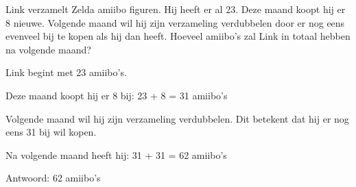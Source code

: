 \begin{opgave}
Link verzamelt Zelda amiibo figuren. Hij heeft er al 23. Deze maand koopt hij 
er 8 nieuwe. Volgende maand wil hij zijn verzameling verdubbelen door er nog 
eens evenveel bij te kopen als hij dan heeft. Hoeveel amiibo's zal Link in 
totaal hebben na volgende maand?
\end{opgave}

\begin{oplossing}
Link begint met 23 amiibo's.

Deze maand koopt hij er 8 bij:
23 + 8 = 31 amiibo's

Volgende maand wil hij zijn verzameling verdubbelen.
Dit betekent dat hij er nog eens 31 bij wil kopen.

Na volgende maand heeft hij:
31 + 31 = 62 amiibo's

Antwoord: 62 amiibo's
\end{oplossing}